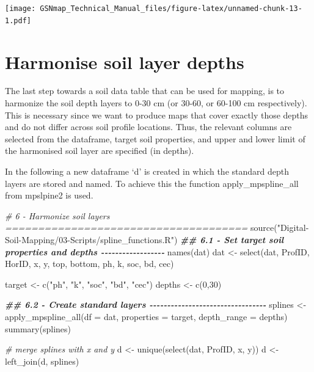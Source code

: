 \documentclass[
  10pt,
  b5paper,
  oneside]{book}
\newenvironment{Shaded}{\begin{snugshade}}{\end{snugshade}}
\newcommand{\AttributeTok}[1]{\textcolor[rgb]{0.77,0.63,0.00}{#1}}
\newcommand{\CommentTok}[1]{\textcolor[rgb]{0.56,0.35,0.01}{\textit{#1}}}
\newcommand{\DecValTok}[1]{\textcolor[rgb]{0.00,0.00,0.81}{#1}}
\newcommand{\DocumentationTok}[1]{\textcolor[rgb]{0.56,0.35,0.01}{\textbf{\textit{#1}}}}
\newcommand{\FunctionTok}[1]{\textcolor[rgb]{0.00,0.00,0.00}{#1}}
\newcommand{\NormalTok}[1]{#1}
\newcommand{\OtherTok}[1]{\textcolor[rgb]{0.56,0.35,0.01}{#1}}
\newcommand{\StringTok}[1]{\textcolor[rgb]{0.31,0.60,0.02}{#1}}
\begin{document}
\texttt{[image: GSNmap\_Technical\_Manual\_files/figure-latex/unnamed-chunk-13-1.pdf]}

\hypertarget{harmonise-soil-layer-depths}{%
\section{Harmonise soil layer depths}\label{harmonise-soil-layer-depths}}

The last step towards a soil data table that can be used for mapping, is to harmonize the soil depth layers to 0-30 cm (or 30-60, or 60-100 cm respectively). This is necessary since we want to produce maps that cover exactly those depths and do not differ across soil profile locations. Thus, the relevant columns are selected from the dataframe, target soil properties, and upper and lower limit of the harmonised soil layer are specified (in depths).

In the following a new dataframe `d' is created in which the standard depth layers are stored and named. To achieve this the function apply\_mpspline\_all from mpslpine2 is used.

\begin{Shaded}
\begin{Highlighting}[]
\CommentTok{\# 6 {-} Harmonize soil layers =====================================}
\FunctionTok{source}\NormalTok{(}\StringTok{"Digital{-}Soil{-}Mapping/03{-}Scripts/spline\_functions.R"}\NormalTok{) }
\DocumentationTok{\#\# 6.1 {-} Set target soil properties and depths {-}{-}{-}{-}{-}{-}{-}{-}{-}{-}{-}{-}{-}{-}{-}{-}{-}{-}}
\FunctionTok{names}\NormalTok{(dat)}
\NormalTok{dat }\OtherTok{\textless{}{-}} \FunctionTok{select}\NormalTok{(dat, ProfID, HorID, x, y, }
\NormalTok{              top, bottom, ph, k, soc, bd, cec)}

\NormalTok{target }\OtherTok{\textless{}{-}} \FunctionTok{c}\NormalTok{(}\StringTok{"ph"}\NormalTok{, }\StringTok{"k"}\NormalTok{, }\StringTok{"soc"}\NormalTok{,  }\StringTok{"bd"}\NormalTok{, }\StringTok{"cec"}\NormalTok{)}
\NormalTok{depths }\OtherTok{\textless{}{-}} \FunctionTok{c}\NormalTok{(}\DecValTok{0}\NormalTok{,}\DecValTok{30}\NormalTok{)}

\DocumentationTok{\#\# 6.2 {-} Create standard layers {-}{-}{-}{-}{-}{-}{-}{-}{-}{-}{-}{-}{-}{-}{-}{-}{-}{-}{-}{-}{-}{-}{-}{-}{-}{-}{-}{-}{-}{-}{-}{-}{-}}
\NormalTok{splines }\OtherTok{\textless{}{-}}\FunctionTok{apply\_mpspline\_all}\NormalTok{(}\AttributeTok{df =}\NormalTok{ dat, }\AttributeTok{properties =} 
\NormalTok{                               target, }\AttributeTok{depth\_range =}\NormalTok{ depths)}
\FunctionTok{summary}\NormalTok{(splines)}

\CommentTok{\# merge splines with x and y}
\NormalTok{d }\OtherTok{\textless{}{-}} \FunctionTok{unique}\NormalTok{(}\FunctionTok{select}\NormalTok{(dat, ProfID, x, y))}
\NormalTok{d }\OtherTok{\textless{}{-}} \FunctionTok{left\_join}\NormalTok{(d, splines)}
\end{Highlighting}
\end{Shaded}
\end{document}
